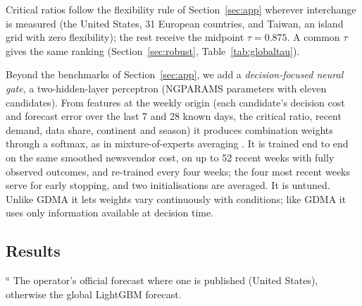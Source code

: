 Critical ratios follow the flexibility rule of Section~\ref{sec:app} wherever interchange is measured (the United States, 31 European countries, and Taiwan, an island grid with zero flexibility); the rest receive the midpoint $\tau=0.875$.
A common $\tau$ gives the same ranking (Section~\ref{sec:robust}, Table~\ref{tab:globaltau}).

Beyond the benchmarks of Section~\ref{sec:app}, we add a \emph{decision-focused neural gate}, a two-hidden-layer perceptron (NGPARAMS parameters with eleven candidates).
From features at the weekly origin (each candidate's decision cost and forecast error over the last 7 and 28 known days, the critical ratio, recent demand, data share, continent and season) it produces combination weights through a softmax, as in mixture-of-experts averaging \citep{Gong2026moe}.
It is trained end to end on the same smoothed newsvendor cost, on up to 52 recent weeks with fully observed outcomes, and re-trained every four weeks; the four most recent weeks serve for early stopping, and two initialisations are averaged.
It is untuned.
Unlike GDMA it lets weights vary continuously with conditions; like GDMA it uses only information available at decision time.

\subsection{Results}

\begin{table}[t]
\centering
\caption{Out-of-sample commitment cost on five continents ($W=28$ days, May 2018 to September 2026, eleven candidates including the three weather models), relative to the reference forecaster. Bold: lowest in the column. Stars: Diebold--Mariano test of equal daily cost against soft GDMA (Newey--West, 7 lags); $^{*}$, $^{**}$, $^{***}$: $p<0.10,0.05,0.01$. $^\dagger$: member of the 90\% model confidence set. Lower is better: values below 1 mean a lower cost than the benchmark.}\label{tab:global}
\footnotesize
\setlength{\tabcolsep}{4pt}

\par\smallskip\footnotesize $^a$ The operator's official forecast where one is published (United States), otherwise the global LightGBM forecast.
\end{table}


